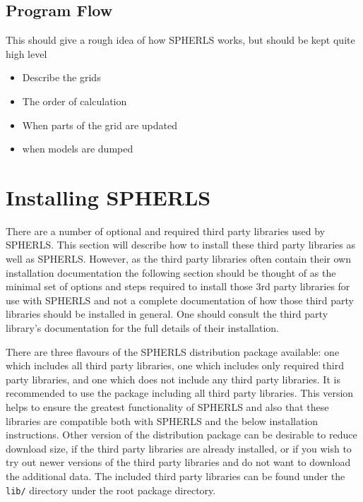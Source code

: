 \documentclass[12pt,a4paper]{book}
\begin{document}
\section{Program Flow}
This should give a rough idea of how SPHERLS works, but should be kept quite high level
\begin{itemize}
\item Describe the grids
\item The order of calculation
\item When parts of the grid are updated
\item when models are dumped
\end{itemize}

\chapter{Installing SPHERLS}

There are a number of optional and required third party libraries used by SPHERLS. This section will describe how to install these third party libraries as well as SPHERLS. However, as the third party libraries often contain their own installation documentation the following section should be thought of as the minimal set of options and steps required to install those 3rd party libraries for use with SPHERLS and not a complete documentation of how those third party libraries should be installed in general. One should consult the third party library's documentation for the full details of their installation.

There are three flavours of the SPHERLS distribution package available: one which includes all third party libraries, one which includes only required third party libraries, and one which does not include any third party libraries. It is recommended to use the package including all third party libraries. This version helps to ensure the greatest functionality of SPHERLS and also that these libraries are compatible both with SPHERLS and the below installation instructions. Other version of the distribution package can be desirable to reduce download size, if the third party libraries are already installed, or if you wish to try out newer versions of the third party libraries and do not want to download the additional data. The included third party libraries can be found under the {\tt lib/} directory under the root package directory.
\end{document}
